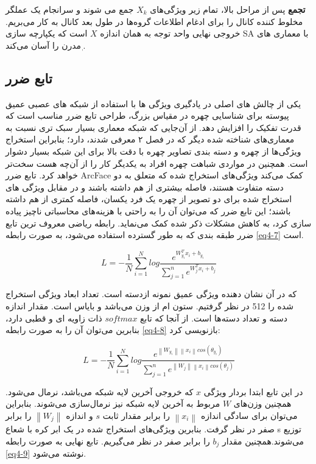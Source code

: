 \textbf{تجمع}
پس از مراحل بالا، تمام زیر ویژگی‌های $X_k$ جمع می شوند و سرانجام یک عملگر مخلوط کننده کانال  را برای ادغام اطلاعات گروه‌ها در طول بعد کانال به کار می‌بریم. خروجی نهایی واحد توجه به همان اندازه $X$ است که یکپارچه سازی SA با معماری های مدرن را آسان می‌‌کند ٖ\cite{yang2021sanet}.

\subsection{تابع ضرر}
یکی از چالش های اصلی در یادگیری ویژگی ها با استفاده از شبکه های عصبی عمیق پیوسته  برای شناسایی چهره در مقیاس بزرگ، طراحی تابع ضرر مناسب است که قدرت تفکیک را افزایش دهد. از آن‌جایی که ‌شبکه  معماری بسیار سبک تری نسبت به معماری‌های شناخته شده دیگر که در فصل ۲ معرفی شدند، دارد؛ بنابراین استخراج ویژگی‌ها از چهره و دسته بندی تصاویر چهره با دقت بالا برای این شبکه بسیار دشوار است. همچنین در مواردی شباهت چهره افراد به یکدیگر ‌کار را از آن‌چه هست سخت‌تر خواهد کرد. تابع ضرر ArcFace \cite{deng2019arcface} کمک می‌کند ویژگی‌های استخراج شده که متعلق به دو دسته متفاوت هستند، فاصله بیشتری از هم داشته باشند و در مقابل ویژگی های استخراج شده برای دو تصویر از چهره یک فرد یکسان، فاصله کمتری از هم داشته باشند؛ این تابع ضرر که می‌توان آن را به راحتی با هزینه‌های محاسباتی ناچیز پیاده سازی کرد، به کاهش مشکلات ذکر شده کمک می‌نماید. 
\noindent
رابطه ریاضی  معروف ترین تابع ضرر طبقه بندی که به طور گسترده استفاده می‌شود، به صورت رابطه \ref{eq4-7} است.

\begin{equation}
L= - \frac{1}{N} \sum_{i=1}^{N} log \frac{e^{{W_{y_i}^T} x_i + b_{y_i}}}{\sum_{j=1}^{n} e^{{W_j^T} x_i + b_j}} 
\label{eq4-7}
\end{equation}

\noindent
که در آن  نشان دهنده ویژگی عمیق نمونه  ازدسته  است. تعداد ابعاد ویژگی استخراج شده را 512 در نظر گرفتیم.  ستون   ام از وزن  می‌باشد و  بایاس است. مقدار اندازه دسته و  تعداد دسته‌ها است. از آنجا که تابع $softmax$ ذات زاویه ای و قطبی دارد، بنابرین می‌توان آن را به صورت رابطه \ref{eq4-8} بازنویسی کرد:

\begin{equation}
L = - \frac{1}{N} \sum_{i=1}^{N} log \frac{e^{\left\|W_{y_i}\right\| \left\|x_i\right\| cos(\theta_{y_i})}}{\sum_{j=1}^{n} e^{\left\|W_j\right\| \left\|x_i\right\| cos(\theta_j)}}
\label{eq4-8}
\end{equation}

\noindent 
در این تابع ابتدا بردار ویژگی ‌$x$ که خروجی آخرین لایه شبکه می‌باشد، نرمال می‌شود. همچنین وزن‌های $W$ مربوط به آخرین لایه شبکه نیز نرمال‌سازی می‌شوند. بنابراین می‌توان برای سادگی اندازه $\left\|x_i\right\|$ را برابر مقدار ثابت $s$ و اندازه $\left\|W_j\right\|$ را برابر صفر در نظر گرفت. بنابرین ویژگی‌های استخراج شده در یک ابر کره با شعاع s توزیع می‌شوند.همچنین مقدار $b_j$ را برابر صفر در نظر می‌گیریم. تابع نهایی به صورت رابطه \ref{eq4-9} نوشته می‌شود.

